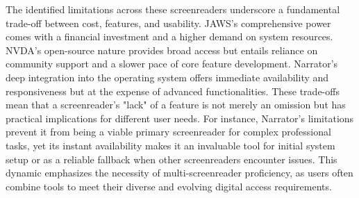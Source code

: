 The identified limitations across these screenreaders underscore a fundamental trade-off between cost, features, and usability. JAWS's comprehensive power comes with a financial investment and a higher demand on system resources. NVDA's open-source nature provides broad access but entails reliance on community support and a slower pace of core feature development. Narrator's deep integration into the operating system offers immediate availability and responsiveness but at the expense of advanced functionalities. These trade-offs mean that a screenreader's "lack" of a feature is not merely an omission but has practical implications for different user needs. For instance, Narrator's limitations prevent it from being a viable primary screenreader for complex professional tasks, yet its instant availability makes it an invaluable tool for initial system setup or as a reliable fallback when other screenreaders encounter issues. This dynamic emphasizes the necessity of multi-screenreader proficiency, as users often combine tools to meet their diverse and evolving digital access requirements.

